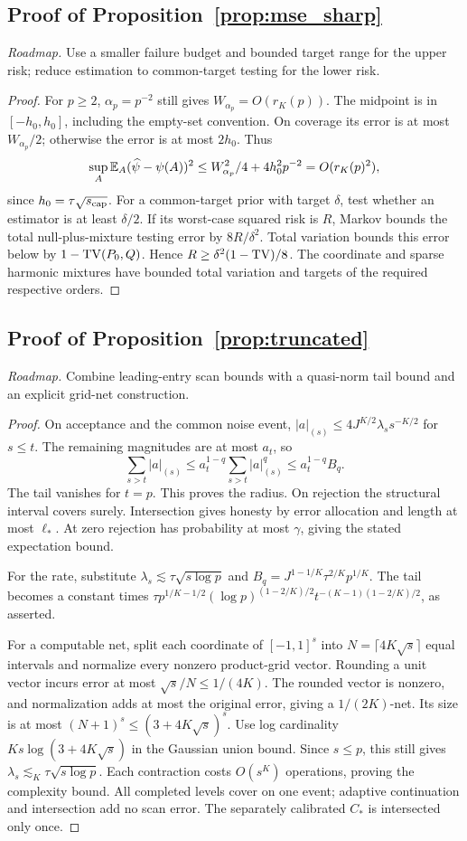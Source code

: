 \subsection{Proof of Proposition~\ref{prop:mse_sharp}}
\noindent\emph{Roadmap.} Use a smaller failure budget and bounded target range for the upper risk; reduce estimation to common-target testing for the lower risk.
\begin{proof}
For $p\ge2$, $\alpha_p=p^{-2}$ still gives $W_{\alpha_p}=O(r_K(p))$.
The midpoint is in $[-h_0,h_0]$, including the empty-set convention.
On coverage its error is at most $W_{\alpha_p}/2$; otherwise the error is at most $2h_0$. Thus
\[
 \sup_A\mathbb E_A(\widehat\psi-\psi(A))^2
 \le W_{\alpha_p}^2/4+4h_0^2p^{-2}=O(r_K(p)^2),
\]
since $h_0=\tau\sqrt{s_{\rm cap}}$.
For a common-target prior with target $\delta$, test whether an estimator is at least $\delta/2$.
If its worst-case squared risk is $R$, Markov bounds the total null-plus-mixture testing error by $8R/\delta^2$.
Total variation bounds this error below by $1-\operatorname{TV}(P_0,Q)$.
Hence $R\ge\delta^2(1-\operatorname{TV})/8$.
The coordinate and sparse harmonic mixtures have bounded total variation and targets of the required respective orders.
\end{proof}

\subsection{Proof of Proposition~\ref{prop:truncated}}
\noindent\emph{Roadmap.} Combine leading-entry scan bounds with a quasi-norm tail bound and an explicit grid-net construction.
\begin{proof}
On acceptance and the common noise event,
$|a|_{(s)}\le4J^{K/2}\lambda_s s^{-K/2}$ for $s\le t$.
The remaining magnitudes are at most $a_t$, so
\[
 \sum_{s>t}|a|_{(s)}
 \le a_t^{1-q}\sum_{s>t}|a|_{(s)}^q\le a_t^{1-q}B_q.
\]
The tail vanishes for $t=p$. This proves the radius.
On rejection the structural interval covers surely.
Intersection gives honesty by error allocation and length at most $\ell_*$.
At zero rejection has probability at most $\gamma$, giving the stated expectation bound.

For the rate, substitute $\lambda_s\lesssim\tau\sqrt{s\log p}$ and
$B_q=J^{1-1/K}\tau^{2/K}p^{1/K}$.
The tail becomes a constant times
$\tau p^{1/K-1/2}(\log p)^{(1-2/K)/2}t^{-(K-1)(1-2/K)/2}$,
as asserted.

For a computable net, split each coordinate of $[-1,1]^s$ into
$N=\lceil4K\sqrt s\rceil$ equal intervals and normalize every nonzero product-grid vector.
Rounding a unit vector incurs error at most $\sqrt s/N\le1/(4K)$.
The rounded vector is nonzero, and normalization adds at most the original error, giving a $1/(2K)$-net.
Its size is at most $(N+1)^s\le(3+4K\sqrt s)^s$.
Use log cardinality $Ks\log(3+4K\sqrt s)$ in the Gaussian union bound.
Since $s\le p$, this still gives $\lambda_s\lesssim_K\tau\sqrt{s\log p}$.
Each contraction costs $O(s^K)$ operations, proving the complexity bound.
All completed levels cover on one event; adaptive continuation and intersection add no scan error. The separately calibrated $C_*$ is intersected only once.
\end{proof}

